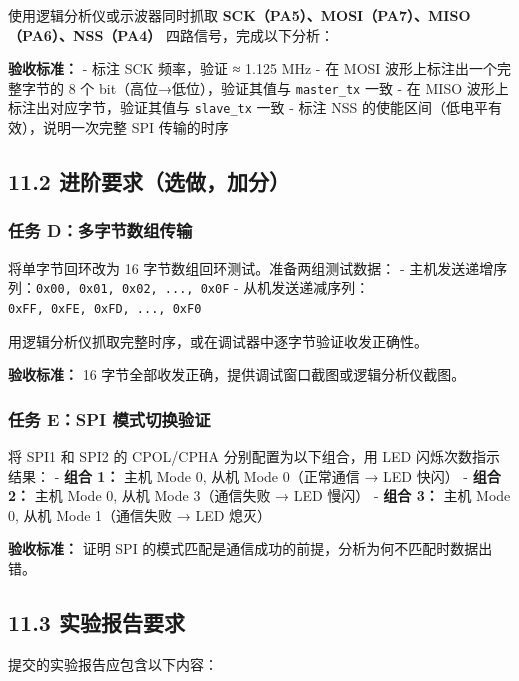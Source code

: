 \documentclass[
  chinese,
  UTF8,
  oneside,
  openany]{ctexbook}
\begin{document}
使用逻辑分析仪或示波器同时抓取
\textbf{SCK（PA5）、MOSI（PA7）、MISO（PA6）、NSS（PA4）}
四路信号，完成以下分析：

\textbf{验收标准：} - 标注 SCK 频率，验证 ≈ 1.125 MHz - 在 MOSI
波形上标注出一个完整字节的 8 个 bit（高位→低位），验证其值与
\texttt{master\_tx} 一致 - 在 MISO 波形上标注出对应字节，验证其值与
\texttt{slave\_tx} 一致 - 标注 NSS
的使能区间（低电平有效），说明一次完整 SPI 传输的时序

\subsection{11.2
进阶要求（选做，加分）}\label{ux8fdbux9636ux8981ux6c42ux9009ux505aux52a0ux5206-1}

\subsubsection{任务
D：多字节数组传输}\label{ux4efbux52a1-dux591aux5b57ux8282ux6570ux7ec4ux4f20ux8f93}

将单字节回环改为 16 字节数组回环测试。准备两组测试数据： -
主机发送递增序列：\texttt{0x00,\ 0x01,\ 0x02,\ ...,\ 0x0F} -
从机发送递减序列：\texttt{0xFF,\ 0xFE,\ 0xFD,\ ...,\ 0xF0}

用逻辑分析仪抓取完整时序，或在调试器中逐字节验证收发正确性。

\textbf{验收标准：} 16
字节全部收发正确，提供调试窗口截图或逻辑分析仪截图。

\subsubsection{任务 E：SPI
模式切换验证}\label{ux4efbux52a1-espi-ux6a21ux5f0fux5207ux6362ux9a8cux8bc1}

将 SPI1 和 SPI2 的 CPOL/CPHA 分别配置为以下组合，用 LED
闪烁次数指示结果： - \textbf{组合 1：} 主机 Mode 0, 从机 Mode
0（正常通信 → LED 快闪） - \textbf{组合 2：} 主机 Mode 0, 从机 Mode
3（通信失败 → LED 慢闪） - \textbf{组合 3：} 主机 Mode 0, 从机 Mode
1（通信失败 → LED 熄灭）

\textbf{验收标准：} 证明 SPI
的模式匹配是通信成功的前提，分析为何不匹配时数据出错。

\subsection{11.3
实验报告要求}\label{ux5b9eux9a8cux62a5ux544aux8981ux6c42-2}

提交的实验报告应包含以下内容：
\end{document}
